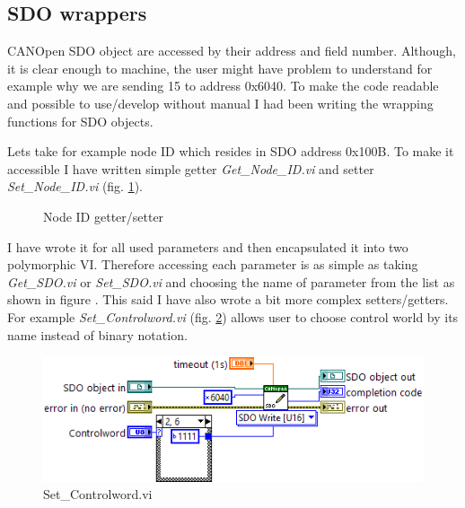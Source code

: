 \subsection{SDO wrappers}
CANOpen SDO object are accessed by their address and field number. Although, it is clear enough to machine, the user might have problem to understand for example why we are sending 15 to address 0x6040. To make the code readable and possible to use/develop without manual I had been writing the wrapping functions for SDO objects.

Lets take for example node ID which resides in SDO address 0x100B. To make it accessible I have written simple getter \textit{Get\_Node\_ID.vi} and setter \textit{Set\_Node\_ID.vi} (fig. \ref{vi:set_get_nodeid}).
\begin{figure}[h]
    \centering
    \caption{Node ID getter/setter}
    \label{vi:set_get_nodeid}
\end{figure}
I have wrote it for all used parameters and then encapsulated it into two polymorphic VI. Therefore accessing each parameter is as simple as taking \textit{Get\_SDO.vi} or \textit{Set\_SDO.vi} and choosing the name of parameter from the list as shown in figure .
This said I have also wrote a bit more complex setters/getters. For example \textit{Set\_Controlword.vi} (fig. \ref{vi:Set_Controlword}) allows user to choose control world by its name instead of binary notation.
\begin{figure}[H]
    \centering
    \includegraphics[scale=\visc,max width=\textwidth]{figures/Set_Controlwordd}
    \caption{Set\_Controlword.vi}
    \label{vi:Set_Controlword}
\end{figure}
